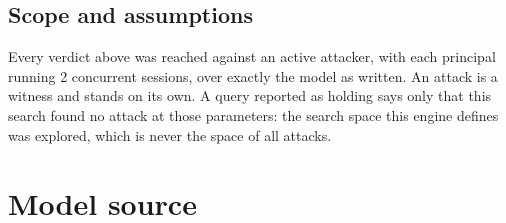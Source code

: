 \documentclass[11pt]{article}
\begin{document}
\subsection{Scope and assumptions}
\noindent Every verdict above was reached against an active attacker, with each principal running 2 concurrent sessions, over exactly the model as written. An attack is a witness and stands on its own. A query reported as holding says only that this search found no attack at those parameters: the search space this engine defines was explored, which is never the space of all attacks.




\appendix
\section{Model source}
\end{document}

